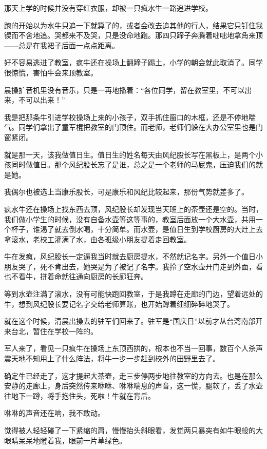 \par 那天上学的时候并没有穿红衣服，却被一只疯水牛一路追进学校。
\par 跑的开始以为水牛只追一下就算了的，或者会改去追其他的行人，结果它只钉住我锲而不舍地追。哭都来不及哭，只是没命地跑。那四只蹄子奔腾着咄咄地拿角来顶——总是在我裙子后面一点点距离。
\par 好不容易逃进了教室，疯牛还在操场上翻蹄子踢土，小学的朝会就此取消了。同学很惊慌，害怕牛会来顶教室。
\par 晨操扩音机里没有音乐，只是一再地播着：“各位同学，留在教室里，不可以出来，不可以出来！”
\par 我是把那条牛引进学校操场上来的小孩子，双手抓住窗口的木框，还是不停地喘气。同学们拿出了童军棍把教室的门顶住。而老师，老师们躲在大办公室里也是门窗紧闭。
\par 就是那一天，该我做值日生。值日生的姓名每天由风纪股长写在黑板上，是两个小孩同时做值日。那个风纪股长忘了是谁，总之是一个老师的马屁鬼，压迫我们的就是她。
\par 我偶尔也被选上当康乐股长，可是康乐和风纪比较起来，那份气势就差多了。
\par 疯水牛还在操场上找东西去顶，风纪股长却发现当天班上的茶壶还是空的。当时，我们做小学生的时候，没有自备水壶等这等事的，教室后面放一个大水壶，共用一个杯子，谁渴了就去倒水喝，十分简单。而水壶，是值日生到学校厨房的大灶上去拿滚水，老校工灌满了水，由各班级小朋友提着走回教室。
\par 牛在发疯，风纪股长一定逼我当时就去厨房提水，不然就记名字。另外一个值日小朋友哭了，死不肯出去，她哭是为了被记了名字。我拎了空水壶开门走到外面，看也不看牛，拼着命就往通向厨房的长廊狂奔。
\par 等到水壶注满了滚水，没有可能快跑回教室，于是我蹲在走廊的门边，望着远处的牛，想到风纪股长要记名字交给老师算账，也开始蹲着细细碎碎地哭了。
\par 就在这个时候，清晨出操去的驻军们回来了。驻军是“国庆日”以前才从台湾南部开来台北，暂住在学校一阵的。
\par 军人来了，看见一只疯牛在操场上东顶西拱的，根本也不当一回事，数百个人杀声震天地不知用上了什么阵法，将牛一步一步赶到校外的田野里去了。
\par 确定牛已经走了，这才提起大茶壶，走三步停两步地往教室的方向去。也是在那么安静的走廊上，身后突然传来咻咻、咻咻喘息的声音，这一慌，腿软了，丢了水壶往地下一蹲，将手抱住头，死啦！牛就在背后。
\par 咻咻的声音还在响，我不敢动。
\par 觉得被人轻轻碰了一下紧缩的肩，慢慢抬头斜眼看，发觉两只暴突有如牛眼般的大眼睛呆呆地瞪着我，眼前一片草绿色。
